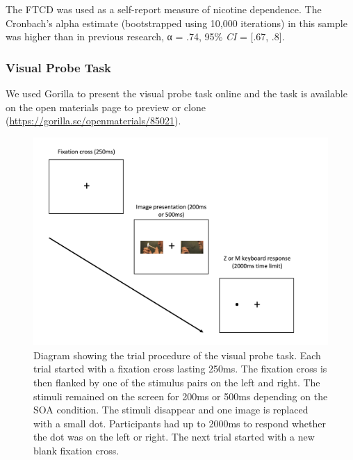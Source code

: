 \documentclass[empirical, authordate]{jote-new-article}
\begin{document}
The FTCD \parencite{Fagerström2012, Heatherton1991} was used as a self-report measure of nicotine dependence. The Cronbach's alpha estimate (bootstrapped using 10,000 iterations) in this sample was higher than in previous research, α = .74, 95\% \emph{CI} = [.67, .8].





\subsubsection{Visual Probe Task}

We used Gorilla \parencite{AnwylIrvine2019} to present the visual probe task online and the task is available on the open materials page to preview or clone (\url{https://gorilla.sc/openmaterials/85021}).
\begin{figure}[h!]

  \begin{fullwidth}
    \includegraphics[width=\linewidth]{media/image1.jpeg}
    \caption{Diagram showing the trial procedure of the visual probe task. Each trial started with a fixation cross lasting 250ms. The fixation cross is then flanked by one of the stimulus pairs on the left and right. The stimuli remained on the screen for 200ms or 500ms depending on the SOA condition. The stimuli disappear and one image is replaced with a small dot. Participants had up to 2000ms to respond whether the dot was on the left or right. The next trial started with a new blank fixation cross.
    }

    \label{fig:1}
  \end{fullwidth}


\end{figure}
\end{document}
